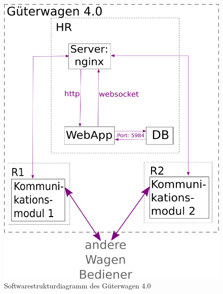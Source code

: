\begin{figure}
    \centering
    \includegraphics[width=10cm%
    ]{Bilder/Softwarestruktur.png}
    \caption{Softwarestrukturdiagramm des Güterwagen 4.0}
    \label{fig:SWStruktur}
\end{figure}

